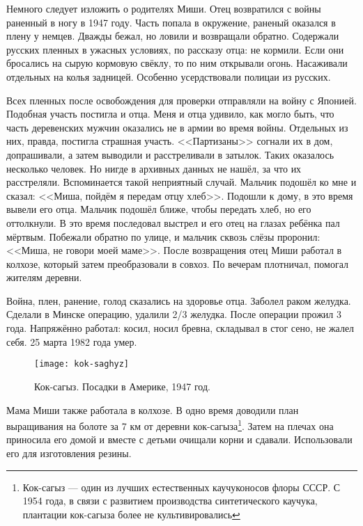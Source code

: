 Немного следует изложить о родителях Миши. Отец возвратился с войны раненный в ногу в 1947 году. Часть попала в окружение, раненый оказался в плену у немцев. Дважды бежал, но ловили и возвращали обратно. Содержали русских пленных в ужасных условиях, по рассказу отца: не кормили. Если они бросались на сырую кормовую свёклу, то по ним открывали огонь. Насаживали отдельных на колья задницей. Особенно усердствовали полицаи из русских. 

Всех пленных после освобождения для проверки отправляли на войну с Японией. Подобная участь постигла и отца. Меня и отца удивило, как могло быть, что часть деревенских мужчин оказались не в армии во время войны. Отдельных из них, правда, постигла страшная участь. <<Партизаны>> согнали их в дом, допрашивали, а затем выводили и расстреливали в затылок. Таких оказалось несколько человек. Но нигде в архивных данных не нашёл, за что их расстреляли. Вспоминается такой неприятный случай. Мальчик подошёл ко мне и сказал: <<Миша, пойдём я передам отцу хлеб>>. Подошли к дому, в это время вывели его отца. Мальчик подошёл ближе, чтобы передать хлеб, но его оттолкнули. В это время последовал выстрел и его отец на глазах ребёнка пал мёртвым. Побежали обратно по улице, и мальчик сквозь слёзы проронил: <<Миша, не говори моей маме>>. 
После возвращения отец Миши работал в колхозе, который затем преобразовали в совхоз. По вечерам плотничал, помогал жителям деревни.

Война, плен, ранение, голод сказались на здоровье отца. Заболел раком желудка. Сделали в Минске операцию, удалили 2/3 желудка. После операции прожил 3 года. Напряжённо работал: косил, носил бревна, складывал в стог сено, не жалел себя. 25 марта 1982 года умер.

\begin{wrapfigure}{O}{.4\textwidth}
\centering
\texttt{[image: kok-saghyz]}
\caption[Кок-сагыз. Посадки в Америке, 1947 год.]{Кок-сагыз. Посадки в Америке, 1947 год\footnotemark.}
\label{fig:kok-saghyz}
\end{wrapfigure}

Мама Миши также работала в колхозе. В одно время доводили план выращивания на болоте за 7 км от деревни кок-сагыза\footnote{Кок-сагыз — один из лучших естественных каучуконосов флоры СССР. С 1954 года, в связи с развитием производства синтетического каучука, плантации кок-сагыза более не культивировались}. Затем на плечах она приносила его домой и вместе с детьми очищали корни и сдавали. Использовали его для изготовления резины.

